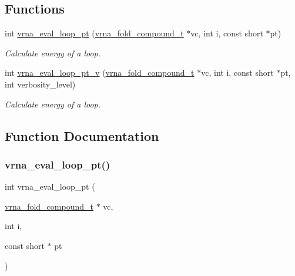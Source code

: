 \subsection*{Functions}
\begin{DoxyCompactItemize}
\item 
int \hyperlink{group__eval__loops_ga730ba4df55c02fd530a0cddd49faf760}{vrna\+\_\+eval\+\_\+loop\+\_\+pt} (\hyperlink{group__fold__compound_ga1b0cef17fd40466cef5968eaeeff6166}{vrna\+\_\+fold\+\_\+compound\+\_\+t} $\ast$vc, int i, const short $\ast$pt)
\begin{DoxyCompactList}\small\item\em Calculate energy of a loop. \end{DoxyCompactList}\item 
int \hyperlink{group__eval__loops_ga30faecaff1009fe62c58312c8d56dabb}{vrna\+\_\+eval\+\_\+loop\+\_\+pt\+\_\+v} (\hyperlink{group__fold__compound_ga1b0cef17fd40466cef5968eaeeff6166}{vrna\+\_\+fold\+\_\+compound\+\_\+t} $\ast$vc, int i, const short $\ast$pt, int verbosity\+\_\+level)
\begin{DoxyCompactList}\small\item\em Calculate energy of a loop. \end{DoxyCompactList}\end{DoxyCompactItemize}


\subsection{Function Documentation}
\mbox{\label{group__eval__loops_ga730ba4df55c02fd530a0cddd49faf760}} 
\subsubsection{\texorpdfstring{vrna\+\_\+eval\+\_\+loop\+\_\+pt()}{vrna\_eval\_loop\_pt()}}
{\footnotesize\ttfamily int vrna\+\_\+eval\+\_\+loop\+\_\+pt (\begin{DoxyParamCaption}\item[{\hyperlink{group__fold__compound_ga1b0cef17fd40466cef5968eaeeff6166}{vrna\+\_\+fold\+\_\+compound\+\_\+t} $\ast$}]{vc,  }\item[{int}]{i,  }\item[{const short $\ast$}]{pt }\end{DoxyParamCaption})}



